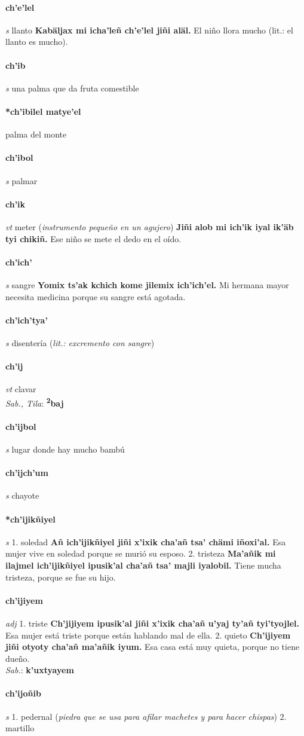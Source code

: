 \documentclass{scrbook}
\newcommand{\entry}[1]{\paragraph{#1}}
\newcommand{\onedefinition}[1]{#1.}
\newcommand{\partofspeech}[1]{\textit{#1}}
\newcommand{\spanishtranslation}[1]{#1}
\newcommand{\clarification}[1]{(\textit{#1})}
\newcommand{\cholexample}[1]{\textbf{#1}}
\newcommand{\exampletranslation}[1]{#1}
\newcommand{\dialectvariant}[1]{\\\textit{#1}:}
\newcommand{\dialectword}[1]{\textbf{#1}}
\begin{document}
\begin{multicols}{2}
\entry{ch'e'lel}
\partofspeech{s}
\spanishtranslation{llanto}
\cholexample{Kabäljax mi icha'leñ ch'e'lel jiñi aläl.}
\exampletranslation{El niño llora mucho (lit.: el llanto es mucho).}

\entry{ch'ib}
\partofspeech{s}
\spanishtranslation{una palma que da fruta comestible}

\entry{*ch'ibilel matye'el}
\spanishtranslation{palma del monte}

\entry{ch'ibol}
\partofspeech{s}
\spanishtranslation{palmar}

\entry{ch'ik}
\partofspeech{vt}
\spanishtranslation{meter}
\clarification{instrumento pequeño en un agujero}
\cholexample{Jiñi alob mi ich'ik iyal ik'äb tyi chikiñ.}
\exampletranslation{Ese niño se mete el dedo en el oído.}

\entry{ch'ich'}
\partofspeech{s}
\spanishtranslation{sangre}
\cholexample{Yomix ts'ak kchich kome jilemix ich'ich'el.}
\exampletranslation{Mi hermana mayor necesita medicina porque su sangre está agotada.}

\entry{ch'ich'tya'}
\partofspeech{s}
\spanishtranslation{disentería}
\clarification{lit.: excremento con sangre}

\entry{ch'ij}
\partofspeech{vt}
\spanishtranslation{clavar}
\dialectvariant{Sab., Tila}
\dialectword{\textsuperscript{2}baj}

\entry{ch'ijbol}
\partofspeech{s}
\spanishtranslation{lugar donde hay mucho bambú}

\entry{ch'ijch'um}
\partofspeech{s}
\spanishtranslation{chayote}

\entry{*ch'ijikñiyel}
\partofspeech{s}
\onedefinition{1}
\spanishtranslation{soledad}
\cholexample{Añ ich'ijikñiyel jiñi x'ixik cha'añ tsa' chämi iñoxi'al.}
\exampletranslation{Esa mujer vive en soledad porque se murió su esposo.}
\onedefinition{2}
\spanishtranslation{tristeza}
\cholexample{Ma'añik mi ilajmel ich'ijikñiyel ipusik'al cha'añ tsa' majli iyalobil.}
\exampletranslation{Tiene mucha tristeza, porque se fue su hijo.}

\entry{ch'ijiyem}
\partofspeech{adj}
\onedefinition{1}
\spanishtranslation{triste}
\cholexample{Ch'jijiyem ipusik'al jiñi x'ixik cha'añ u'yaj ty'añ tyi'tyojlel.}
\exampletranslation{Esa mujer está triste porque están hablando mal de ella.}
\onedefinition{2}
\spanishtranslation{quieto}
\cholexample{Ch'ijiyem jiñi otyoty cha'añ ma'añik iyum.}
\exampletranslation{Esa casa está muy quieta, porque no tiene dueño.}
\dialectvariant{Sab.}
\dialectword{k'uxtyayem}

\entry{ch'ijoñib}
\partofspeech{s}
\onedefinition{1}
\spanishtranslation{pedernal}
\clarification{piedra que se usa para afilar machetes y para hacer chispas}
\onedefinition{2}
\spanishtranslation{martillo}


\end{multicols}
\end{document}
